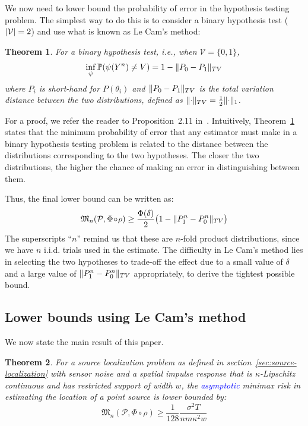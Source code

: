 \documentclass[conference]{IEEEtran}
\DeclarePairedDelimiter\abs{\lvert}{\rvert}
\DeclarePairedDelimiter\norm{\lVert}{\rVert}
\newcommand{\Phiorho}{\Phi\!\circ\!\rho}
\newtheorem{theorem}{Theorem}
\begin{document}
We now need to lower bound the probability of error in the hypothesis testing
problem. The simplest way to do this is to consider a binary hypothesis test
($\abs{\mathcal{V}} = 2$) and use what is known as Le Cam's method:
\begin{theorem} \label{thm:le-cam}
	For a binary hypothesis test, i.e., when $\mathcal{V} = \{0, 1\}$,
	\begin{equation}
		\inf_\psi \mathbb P(\psi(Y^n) \neq V) = 1 - \norm{P_0 - P_1}_{TV}
	\end{equation}
	where $P_i$ is short-hand for $P(\theta_i)$ and $\norm{P_0 - P_1}_{TV}$ is
	the total variation distance between the two distributions, defined as
	$\norm{\cdot}_{TV} = \frac{1}{2} \norm{\cdot}_1$.
\end{theorem}
For a proof, we refer the reader to Proposition~2.11
in~\cite{Duchi2015Information}.  Intuitively, Theorem~\ref{thm:le-cam} states
that the minimum probability of error that any estimator must make in a binary
hypothesis testing problem is related to the distance between the distributions
corresponding to the two hypotheses. The closer the two distributions, the
higher the chance of making an error in distinguishing between them.

Thus, the final lower bound can be written as:
\begin{equation} \label{eq:le-cam-bound}
	\mathfrak{M}_n(\mathcal P, \Phiorho) \geq \frac{\Phi(\delta)}{2} \big(1 - \norm{P_1^n - P_0^n}_{TV}\big)
\end{equation}
The superscripts ``$n$'' remind us that these are $n$-fold product
distributions, since we have $n$ i.i.d. trials used in the estimate.  The
difficulty in Le Cam's method lies in selecting the two hypotheses to trade-off
the effect due to a small value of $\delta$ and a large value of $\norm{P_1^n -
P_0^n}_{TV}$ appropriately, to derive the tightest possible bound.

\subsection{Lower bounds using Le Cam's method}

We now state the main result of this paper.
\begin{theorem} \label{thm:main-lb}
	For a source localization problem as defined in
	section~\ref{sec:source-localization} with sensor noise and a spatial
	impulse response that is $\kappa$-Lipschitz continuous and has restricted
	support of width $w$, the \textcolor{blue}{asymptotic} minimax risk in estimating the
	location of a point source is lower bounded by:
	\begin{equation} \label{eq:main-lower-bound}
		\mathfrak{M}_n(\mathcal{P}, \Phiorho) \geq \frac{1}{128} \frac{\sigma^2 T}{nm\kappa^2w}
	\end{equation}
\end{theorem}
\end{document}
